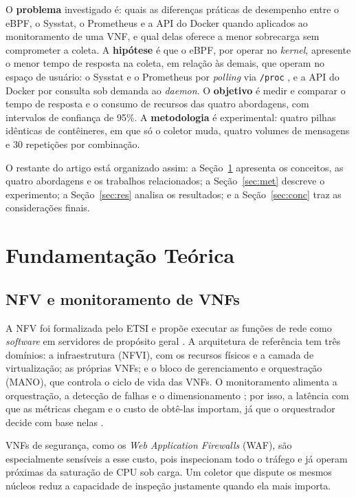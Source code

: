 \documentclass{ieeeaccess}
\begin{document}
O \textbf{problema} investigado é: quais as diferenças práticas de desempenho entre o eBPF, o Sysstat, o Prometheus e a API do Docker quando aplicados ao monitoramento de uma VNF, e qual delas oferece a menor sobrecarga sem comprometer a coleta. A \textbf{hipótese} é que o eBPF, por operar no \textit{kernel}, apresente o menor tempo de resposta na coleta, em relação às demais, que operam no espaço de usuário: o Sysstat e o Prometheus por \textit{polling} \cite{rfc9232} via \texttt{/proc} \cite{linux_proc_man}, e a API do Docker por consulta sob demanda ao \textit{daemon}. O \textbf{objetivo} é medir e comparar o tempo de resposta e o consumo de recursos das quatro abordagens, com intervalos de confiança de 95\%. A \textbf{metodologia} é experimental: quatro pilhas idênticas de contêineres, em que só o coletor muda, quatro volumes de mensagens e 30 repetições por combinação.

O restante do artigo está organizado assim: a Seção~\ref{sec:fund} apresenta os conceitos, as quatro abordagens e os trabalhos relacionados; a Seção~\ref{sec:met} descreve o experimento; a Seção~\ref{sec:res} analisa os resultados; e a Seção~\ref{sec:conc} traz as considerações finais.

\section{Fundamentação Teórica}
\label{sec:fund}
\subsection{NFV e monitoramento de VNFs}
A NFV foi formalizada pelo ETSI e propõe executar as funções de rede como \textit{software} em servidores de propósito geral \cite{etsi_nfv_002_2014,etsi_nfv_006_2024,mijumbi2016}. A arquitetura de referência tem três domínios: a infraestrutura (NFVI), com os recursos físicos e a camada de virtualização; as próprias VNFs; e o bloco de gerenciamento e orquestração (MANO), que controla o ciclo de vida das VNFs. O monitoramento alimenta a orquestração, a detecção de falhas e o dimensionamento \cite{usman_observability_2022}; por isso, a latência com que as métricas chegam e o custo de obtê-las importam, já que o orquestrador decide com base nelas \cite{oliveira_observability_2026}.

VNFs de segurança, como os \textit{Web Application Firewalls} (WAF), são especialmente sensíveis a esse custo, pois inspecionam todo o tráfego e já operam próximas da saturação de CPU sob carga. Um coletor que dispute os mesmos núcleos reduz a capacidade de inspeção justamente quando ela mais importa.
\end{document}
